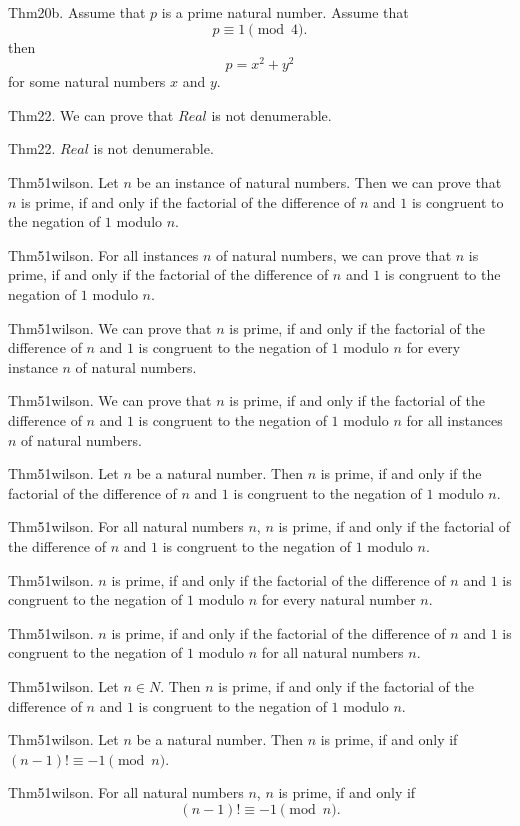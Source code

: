 \documentclass{article}
\begin{document}
Thm20b. Assume that $p$ is a prime natural number. Assume that $$p \equiv 1 \pmod{ 4}.$$ then $$p = x ^{ 2}+ y ^{ 2}$$ for some natural numbers $x$ and $y$.

Thm22. We can prove that $Real$ is not denumerable.

Thm22. $Real$ is not denumerable.

Thm51wilson. Let $n$ be an instance of natural numbers. Then we can prove that $n$ is prime, if and only if the factorial of the difference of $n$ and $1$ is congruent to the negation of $1$ modulo $n$.

Thm51wilson. For all instances $n$ of natural numbers, we can prove that $n$ is prime, if and only if the factorial of the difference of $n$ and $1$ is congruent to the negation of $1$ modulo $n$.

Thm51wilson. We can prove that $n$ is prime, if and only if the factorial of the difference of $n$ and $1$ is congruent to the negation of $1$ modulo $n$ for every instance $n$ of natural numbers.

Thm51wilson. We can prove that $n$ is prime, if and only if the factorial of the difference of $n$ and $1$ is congruent to the negation of $1$ modulo $n$ for all instances $n$ of natural numbers.

Thm51wilson. Let $n$ be a natural number. Then $n$ is prime, if and only if the factorial of the difference of $n$ and $1$ is congruent to the negation of $1$ modulo $n$.

Thm51wilson. For all natural numbers $n$, $n$ is prime, if and only if the factorial of the difference of $n$ and $1$ is congruent to the negation of $1$ modulo $n$.

Thm51wilson. $n$ is prime, if and only if the factorial of the difference of $n$ and $1$ is congruent to the negation of $1$ modulo $n$ for every natural number $n$.

Thm51wilson. $n$ is prime, if and only if the factorial of the difference of $n$ and $1$ is congruent to the negation of $1$ modulo $n$ for all natural numbers $n$.

Thm51wilson. Let $n \in N$. Then $n$ is prime, if and only if the factorial of the difference of $n$ and $1$ is congruent to the negation of $1$ modulo $n$.

Thm51wilson. Let $n$ be a natural number. Then $n$ is prime, if and only if $(n - 1)! \equiv - 1 \pmod{ n}$.

Thm51wilson. For all natural numbers $n$, $n$ is prime, if and only if $$(n - 1)! \equiv - 1 \pmod{ n}.$$
\end{document}
